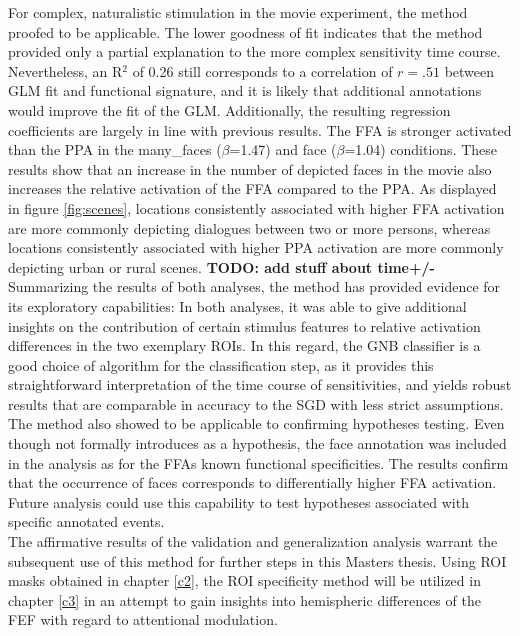 \documentclass[a4paper, 12pt]{scrreprt}
\begin{document}
For complex, naturalistic stimulation in the movie experiment, the method proofed to be applicable. The lower goodness of fit indicates that the method provided only a partial explanation to the more complex sensitivity time course. Nevertheless, an R$^2$ of 0.26 still corresponds to a correlation of $r = .51$ between GLM fit and functional signature, and it is likely that additional annotations would improve the fit of the GLM. Additionally, the resulting regression coefficients are largely in line with previous results. The FFA is stronger activated than the PPA in the many\_faces ($\beta$=1.47) and face ($\beta$=1.04) conditions. These results show that an increase in the number of depicted faces in the movie also increases the relative activation of the FFA compared to the PPA. As displayed in figure \ref{fig:scenes}, locations consistently associated with higher FFA activation are more commonly depicting dialogues between two or more persons, whereas locations consistently associated with higher PPA activation are more commonly depicting urban or rural scenes. \textbf{TODO: add stuff about time+/-}\\
Summarizing the results of both analyses, the method has provided evidence for its exploratory capabilities: In both analyses, it was able to give additional insights on the contribution of certain stimulus features to relative activation differences in the two exemplary ROIs. In this regard, the GNB classifier is a good choice of algorithm for the classification step, as it provides this straightforward interpretation of the time course of sensitivities, and yields robust results that are comparable in accuracy to the SGD with less strict assumptions. The method also showed to be applicable to confirming hypotheses testing. Even though not formally introduces as a hypothesis, the face annotation was included in the analysis as for the FFAs known functional specificities. The results confirm that the occurrence of faces corresponds to differentially higher FFA activation. Future analysis could use this capability to test hypotheses associated with specific annotated events. \\ 
The affirmative results of the validation and generalization analysis warrant the subsequent use of this method for further steps in this Masters thesis. Using ROI masks obtained in chapter \ref{c2}, the ROI specificity method will be utilized in chapter \ref{c3} in an attempt to gain insights into hemispheric differences of the FEF with regard to attentional modulation. \\
\end{document}
